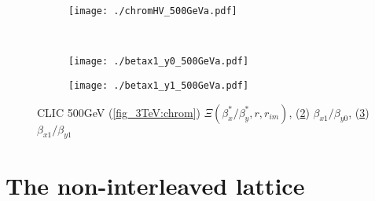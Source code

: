 \begin{figure}
\begin{subfigure}{1.0\textwidth}
 \texttt{[image: ./chromHV\_500GeVa.pdf]}\caption{}\label{fig_chrom:b}
 \end{subfigure}\\
 \begin{subfigure}{0.5\textwidth}
 \texttt{[image: ./betax1\_y0\_500GeVa.pdf]}\caption{}\label{fig_500GeV:bx1_y0}
 \end{subfigure}
  \begin{subfigure}{0.5\textwidth}
 \texttt{[image: ./betax1\_y1\_500GeVa.pdf]}\caption{}\label{fig_500GeV:bx1_y1}
 \end{subfigure}
 \caption{CLIC 500GeV (\ref{fig_3TeV:chrom}) $\Xi(\beta^*_x/\beta^*_y,r,r_{im})$, (\ref{fig_500GeV:bx1_y0}) $\beta_{x1}/\beta_{y0}$, (\ref{fig_500GeV:bx1_y1}) $\beta_{x1}/\beta_{y1}$}\label{f:fig_500GeV}
\end{figure}
\clearpage

\section{The non-interleaved lattice}
